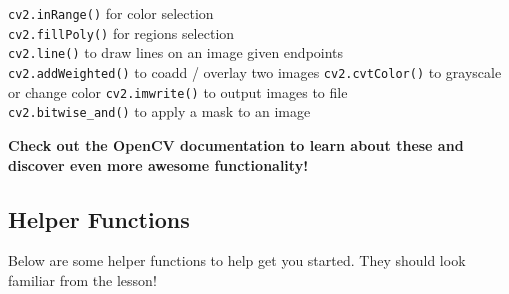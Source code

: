 \documentclass[11pt]{article}
\begin{document}
\texttt{cv2.inRange()} for color selection\\
\texttt{cv2.fillPoly()} for regions selection\\
\texttt{cv2.line()} to draw lines on an image given endpoints\\
\texttt{cv2.addWeighted()} to coadd / overlay two images
\texttt{cv2.cvtColor()} to grayscale or change color
\texttt{cv2.imwrite()} to output images to file\\
\texttt{cv2.bitwise\_and()} to apply a mask to an image

\textbf{Check out the OpenCV documentation to learn about these and
discover even more awesome functionality!}

    \hypertarget{helper-functions}{%
\subsection{Helper Functions}\label{helper-functions}}

    Below are some helper functions to help get you started. They should
look familiar from the lesson!
\end{document}
